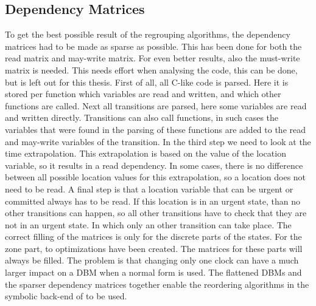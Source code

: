 \subsection{Dependency Matrices}
\label{subsec:matrices}
To get the best possible result of the regrouping algorithms, the dependency matrices had to be made as sparse as possible. This has been done for both the read matrix and may-write matrix. For even better results, also the must-write matrix is needed. This needs effort when analysing the code, this can be done, but is left out for this thesis. First of all, all C-like code is parsed. Here it is stored per function which variables are read and written, and which other functions are called. Next all transitions are parsed, here some variables are read and written directly. Transitions can also call functions, in such cases the variables that were found in the parsing of these functions are added to the read and may-write variables of the transition. In the third step we need to look at the time extrapolation. This extrapolation is based on the value of the location variable, so it results in a read dependency. In some cases, there is no difference between all possible location values for this extrapolation, so a location does not need to be read. A final step is that a location variable that can be urgent or committed always has to be read. If this location is in an urgent state, than no other transitions can happen, so all other transitions have to check that they are not in an urgent state. In which only an other transition can take place.
The correct filling of the matrices is only for the discrete parts of the states. For the zone part, to optimizations have been created. The matrices for these parts will always be filled. The problem is that changing only one clock can have a much larger impact on a DBM when a normal form is used. The flattened DBMs and the sparser dependency matrices together enable the reordering algorithms in the symbolic back-end of \ltsmin{} to be used.

